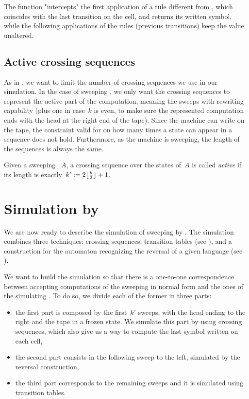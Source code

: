 The function "intercepts" the first application of a rule different from , which coincides with the last transition on the cell, and returns its written symbol, while the following applications of the rules (previous transitions) keep the value unaltered.


\subsection{Active crossing sequences}
As in \TDFAs, we want to limit the number of crossing sequences we use in our simulation.
In the case of sweeping \kDLAs, we only want the crossing sequences to represent the active part of the computation, meaning the sweeps with rewriting capability (plus one in case~$k$ is even, to make sure the represented computation ends with the head at the right end of the tape).
Since the machine can write on the tape, the constraint valid for \TDFAs on how many times a state can appear in a sequence does not hold. Furthermore, as the machine is sweeping, the length of the sequences is always the same.
\begin{defn}
	Given a sweeping \kLA~$A$, a crossing sequence over the states of~$A$ is called \emph{active} if its length is exactly~$k':=2\lfloor \frac{k}{2} \rfloor+1$.
\end{defn}



\section{Simulation by \texorpdfstring{\ONFAs}{1NFAs}}\label{sec:swkdla-to-NFA}
We are now ready to describe the simulation of sweeping \kDLAs by \ONFAs.
The simulation combines three techniques: crossing sequences, transition tables (see ), and a construction for the automaton recognizing the reversal of a given language (see ).

We want to build the simulation so that there is a one-to-one correspondence between accepting computations of the sweeping \kDLA in normal form and the ones of the simulating \ONFA.
To do so, we divide each of the former in three parts:
\begin{itemize}
	\item the first part is composed by the first~$k'$ sweeps, with the head ending to the right and the tape in a frozen state. We simulate this part by using crossing sequences, which also give us a way to compute the last symbol written on each cell,
	\item the second part consists in the following sweep to the left, simulated by the reversal construction,
	\item the third part corresponds to the remaining sweeps and it is simulated using transition tables.
\end{itemize}


